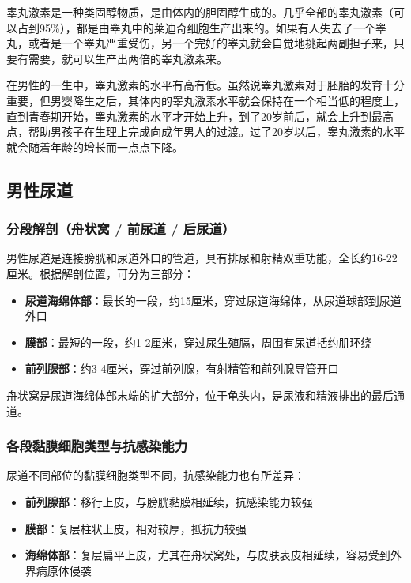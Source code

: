 睾丸激素是一种类固醇物质，是由体内的胆固醇生成的。几乎全部的睾丸激素（可以占到95\%），都是由睾丸中的莱迪奇细胞生产出来的。如果有人失去了一个睾丸，或者是一个睾丸严重受伤，另一个完好的睾丸就会自觉地挑起两副担子来，只要有需要，就可以生产出两倍的睾丸激素来。

在男性的一生中，睾丸激素的水平有高有低。虽然说睾丸激素对于胚胎的发育十分重要，但男婴降生之后，其体内的睾丸激素水平就会保持在一个相当低的程度上，直到青春期开始，睾丸激素的水平才开始上升，到了20岁前后，就会上升到最高点，帮助男孩子在生理上完成向成年男人的过渡。过了20岁以后，睾丸激素的水平就会随着年龄的增长而一点点下降。

\subsection{男性尿道}
\subsubsection{分段解剖（舟状窝 / 前尿道 / 后尿道）}

男性尿道是连接膀胱和尿道外口的管道，具有排尿和射精双重功能，全长约16-22厘米。根据解剖位置，可分为三部分：

\begin{itemize}
    \item \textbf{尿道海绵体部}：最长的一段，约15厘米，穿过尿道海绵体，从尿道球部到尿道外口
    \item \textbf{膜部}：最短的一段，约1-2厘米，穿过尿生殖膈，周围有尿道括约肌环绕
    \item \textbf{前列腺部}：约3-4厘米，穿过前列腺，有射精管和前列腺导管开口
\end{itemize}

舟状窝是尿道海绵体部末端的扩大部分，位于龟头内，是尿液和精液排出的最后通道。

\subsubsection{各段黏膜细胞类型与抗感染能力}

尿道不同部位的黏膜细胞类型不同，抗感染能力也有所差异：

\begin{itemize}
    \item \textbf{前列腺部}：移行上皮，与膀胱黏膜相延续，抗感染能力较强
    \item \textbf{膜部}：复层柱状上皮，相对较厚，抵抗力较强
    \item \textbf{海绵体部}：复层扁平上皮，尤其在舟状窝处，与皮肤表皮相延续，容易受到外界病原体侵袭
\end{itemize}


